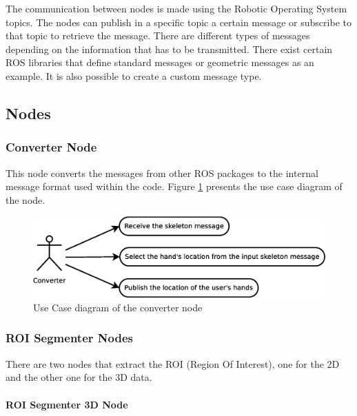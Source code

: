 \documentclass{article}
\begin{document}
The communication between nodes is made using the Robotic Operating System topics. The nodes can publish in a specific topic a certain message or subscribe to that topic to retrieve the message. 
There are different types of messages depending on the information that has to be transmitted. There exist certain ROS libraries that define standard messages or geometric messages as an example. It is also possible to create a custom message type. 


\subsection{Nodes}

\subsubsection{Converter Node}

This node converts the messages from other ROS packages to the internal message format used within the code. 
Figure \ref{uc_converter} presents the use case diagram of the node. 

\begin{figure}[H]
\begin{center}
	\includegraphics[scale=0.4]{../../img/diagrams/uc_converter.eps}
			\caption[Use case diagram converter node]{Use Case diagram of the converter node}
		\label{uc_converter}
\end{center}
\end{figure}
	
\subsubsection{ROI Segmenter Nodes}
There are two nodes that extract the ROI (Region Of Interest), one for the 2D and the other one for the 3D data.

\paragraph {ROI Segmenter 3D Node\\[0.5cm]}
\end{document}
